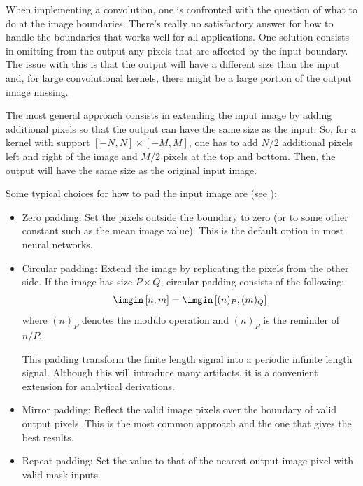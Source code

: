 When implementing a convolution, one is confronted with the question of what to do at the image boundaries.
There's really no satisfactory answer for how to handle the
boundaries that works well for all applications. One solution consists in omitting from the output any pixels that are affected by the input boundary. The issue with this is that the output will have a different size than the input and, for large convolutional kernels, there might be a large portion of the output image missing.

The most general approach consists in extending the input image by adding additional pixels so that the output can have the same size as the input. So, for a kernel with support $\left[ -N, N \right] \times \left[-M, M\right]$, one has to add $N/2$ additional pixels left and right of the image and $M/2$ pixels at the top and bottom. Then, the output will have the same size as the original input image.

Some typical choices for how to pad the input image are (see \fig{\ref{fig:boundaries}}):
\begin{itemize}
	\item Zero padding: Set the pixels outside the boundary to zero (or to some other constant such as the mean image value). This is the default option in most neural networks.
	\item Circular padding: Extend the image by replicating the pixels from the other side. If the image has size $P \times Q$, circular padding consists of the following:
	      \begin{equation}
		      \imgin \left[n,m\right] = \imgin \left[(n)_P,(m)_Q\right]
	      \end{equation}
	      where $(n)_P$ denotes the modulo operation and $(n)_P$ is the reminder of $n/P$.

	      This padding transform the finite length signal into a periodic infinite length signal. Although this will introduce many artifacts, it is a convenient extension for analytical derivations.
	\item Mirror padding: Reflect the valid image pixels over the boundary of valid output pixels. This is the most common approach and the one that gives the best results.
	\item Repeat padding: Set the value to that of the nearest output image pixel with valid mask inputs.
\end{itemize}

